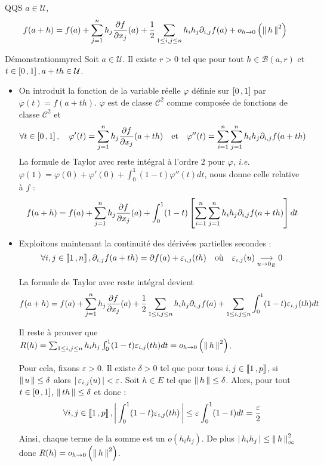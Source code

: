     \begin{theo}{}{}
        QQS $a \in \mathcal{U}$, 
        \[ f(a+h) = f(a) + \sum_{j=1}^{n} h_j \frac{\partial f}{\partial x_j}(a) + \frac{1}{2} \sum_{1 \leq i,j \leq n} h_i h_j \partial_{i,j}f(a) + o_{h \rightarrow 0} \left(\left\lVert \,h \, \right\rVert^2\right) \]    
    \end{theo}

    \begin{demo}{Démonstration}{myred}
        Soit $a \in \mathcal{U}$. Il existe $r > 0$ tel que pour tout $h \in \mathcal{B}(a,r)$ et $t \in \left[ 0 \, , 1 \right], a + th \in \mathcal{U}$. 
        \begin{itemize}
            \item On introduit la fonction de la variable réelle $\varphi$ définie sur $\left[ 0 \, , 1 \right]$ par $\varphi(t) = f(a + th)$. $\varphi$ est de classe $\mathcal{C}^2$ comme composée de fonctions de classe $\mathcal{C}^2$ et 
            \[ \forall t \in \left[ 0 \, , 1 \right], \quad \varphi'(t) = \sum_{j=1}^{n} h_j \frac{\partial f}{\partial x_j}(a + th) \quad \text{et} \quad \varphi''(t) = \sum_{i=1}^{n} \sum_{j=1}^{n} h_i h_j \partial_{i,j} f(a + th) \]   
            La formule de Taylor avec reste intégral à l’ordre $2$ pour $\varphi$, \textit{i.e.} $\varphi(1) = \varphi(0) + \varphi'(0) + \int_{0}^{1} (1-t) \varphi''(t) dt$, nous donne celle relative à $f$ : 
            \[ f(a + h) = f(a) + \sum_{j=1}^{n} h_j \frac{\partial f}{\partial x_j}(a) + \int_{0}^{1} (1-t) \left[\sum_{i=1}^{n} \sum_{j=1}^{n} h_i h_j \partial_{i,j} f (a + t h)\right] dt \]
            \item Exploitons maintenant la continuité des dérivées partielles secondes : 
            \[ \forall i,j \in \left\llbracket 1 \, , n \right\rrbracket, \partial_{i,j}f(a + th) = \partial f(a) + \varepsilon_{i,j}(th) \quad \text{où} \quad \varepsilon_{i,j}(u) \underset{u \rightarrow 0_E}{\longrightarrow} 0 \]   

            La formule de Taylor avec reste intégral devient 
            \[ f(a+h) = f(a) + \sum_{j=1}^{n} h_j \frac{\partial f}{\partial x_j}(a) + \frac{1}{2} \sum_{1 \leq i,j \leq n} h_i h_j \partial_{i,j} f(a) + \sum_{1 \leq i,j \leq n} \int_{0}^{1} (1-t)\varepsilon_{i,j}(th)dt \]    

            Il reste à prouver que $R(h) = \sum_{1 \leq i,j \leq n} h_i h_j \int_{0}^{1} (1-t) \varepsilon_{i,j}(th) dt = o_{h \rightarrow 0} \left(\left\lVert \,h \, \right\rVert^2\right)$. 

            Pour cela, fixons $\varepsilon > 0$. Il existe $\delta > 0$ tel que pour tous $i,j \in \left\llbracket 1 \, , p \right\rrbracket$, si $\left\lVert \,u \, \right\rVert \leq \delta$ alors $\left\lvert \,\varepsilon_{i,j}(u) \, \right\rvert < \varepsilon$. Soit $h \in E$ tel que $\left\lVert \,h \, \right\rVert \leq \delta$. Alors, pour tout $t \in \left[ 0 \, , 1 \right]$, $\left\lVert \,th \, \right\rVert \leq \delta$ et donc :
            \[ \forall i,j \in \left\llbracket 1 \, , p \right\rrbracket, \left\lvert \,\int_{0}^{1} (1-t)\varepsilon_{i,j}(th) \, \right\rvert \leq \varepsilon \int_{0}^{1} (1-t)dt = \frac{\varepsilon}{2} \]   

            Ainsi, chaque terme de la somme est un $o(h_i h_j)$. De plus $\left\lvert \,h_i h_j \, \right\rvert \leq \left\lVert \,h \, \right\rVert^2_{\infty}$ donc $R(h) = o_{h \rightarrow 0} \left(\left\lVert \,h \, \right\rVert^2\right)$.
        \end{itemize}
    \end{demo}


